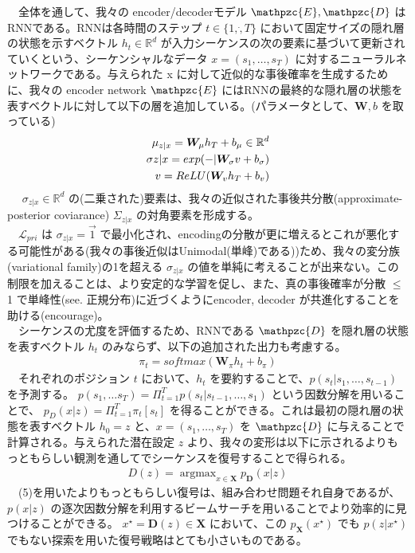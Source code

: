\documentclass{scrartcl}
\DeclareMathOperator*{\argmax}{argmax}
\begin{document}
　全体を通して、我々の encoder/decoderモデル \(\mathpzc{E},\mathpzc{D}\) はRNNである。RNNは各時間のステップ \(t\in\{1,\dot,T\}\) において固定サイズの隠れ層の状態を示すベクトル \(h_t \in \mathbb{R}^d\) が入力シーケンスの次の要素に基づいて更新されていくという、シーケンシャルなデータ \(x = (s_1, \dots , s_{T})\) に対するニューラルネットワークである。与えられた x に対して近似的な事後確率を生成するために、我々の encoder network \(\mathpzc{E}\) にはRNNの最終的な隠れ層の状態を表すベクトルに対して以下の層を追加している。(パラメータとして、\(\bm{W}, b\) を取っている)\\
\begin{align}
\mu_{z|x} = \bm{W}_{\mu}h_{T} + b_{\mu} \in \mathbb{R}^d \\ 
\sigma{z|x} = exp(-|\bm{W}_{\sigma}v + b_{\sigma})  \notag \\ 
v = ReLU(\bm{W}_v h_{T}+b_v) \notag
\end{align}
　 \(\sigma_{z|x} \in \mathbb{R}^d\) の(二乗された)要素は、我々の近似された事後共分散(approximate-posterior coviarance) \(\Sigma_{z|x}\) の対角要素を形成する。\\
　\(\mathcal{L}_{pri}\) は \(\sigma_{z|x} = \vec{1}\) で最小化され、encodingの分散が更に増えるとこれが悪化する可能性がある(我々の事後近似はUnimodal(単峰)である))ため、我々の変分族(variational family)の1を超える \(\sigma_{z|x}\) の値を単純に考えることが出来ない。この制限を加えることは、より安定的な学習を促し、また、真の事後確率が分散 \(\leqslant\) 1 で単峰性(see. 正規分布)に近づくようにencoder, decoder が共進化することを助ける(encourage)。\\
　シーケンスの尤度を評価するため、RNNである \(\mathpzc{D}\) を隠れ層の状態を表すベクトル \(h_t\) のみならず、以下の追加された出力も考慮する。\\
\begin{align}
\pi_t = softmax(\bm{W}_{\pi}h_t + b_{\pi})
\end{align}
　それぞれのポジション \(t\) において、\(h_t\) を要約することで、\(p(s_t| s_1,\dots , s_{t-1})\) を予測する。 \(p(s_1,\dots s_T) = \Pi^T_{t=1}p(s_t|s_{t-1}, \dots ,s_1)\) という因数分解を用いることで、 \(p_{D}(x|z)=\Pi^T_{t=1}\pi_t[s_t]\) を得ることができる。これは最初の隠れ層の状態を表すベクトル \(h_0 = z\) と、\(x = (s_1, \dots , s_T)\) を \(\mathpzc{D}\) に与えることで計算される。与えられた潜在設定 \(z\) より、我々の変形は以下に示されるよりもっともらしい観測を通してでシーケンスを復号することで得られる。\\
\begin{align}
D(z) = \argmax_{x\in \bm{X}} p_{\bm{D}}(x|z)
\end{align}
　(5)を用いたよりもっともらしい復号は、組み合わせ問題それ自身であるが、 \(p(x|z)\) の逐次因数分解を利用するビームサーチを用いることでより効率的に見つけることができる。 \(x^{\star} = \bm{D}(z) \in \bm{X}\) において、この \(p_{\bm{X}}(x^{\star})\) でも \(p(z|x^{\star})\) でもない探索を用いた復号戦略はとても小さいものである。\\
\end{document}
